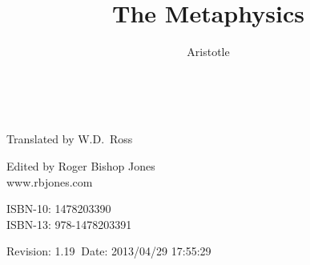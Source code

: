 \newcommand{\RbJldq}{``}
\newcommand{\RbJrdq}{''}
\newcommand{\RbJdq}{\textquotedbl}

\title{The Metaphysics}
\author{Aristotle}
\date{\ }



\renewcommand{\thechapter}{Book \arabic{chapter}}
\renewcommand{\thesection}{Part \arabic{section}}

\addtolength{\cftchapnumwidth}{3em}
\addtolength{\cftsecnumwidth}{2.5em}
\addtolength{\cftsubsecnumwidth}{0.5em}
\cftsetpnumwidth{2em}

\frontmatter

\begin{titlepage}
\maketitle

\hspace{2in}

\vfill

\begin{centering}

Translated by W.D.~Ross\\

\vspace{0.2in}

Edited by Roger Bishop Jones\\
www.rbjones.com\\

\vspace{0.2in}

ISBN-10: 1478203390\\
ISBN-13: 978-1478203391

\vspace{0.2in}

{\footnotesize

$ $Revision: 1.19 $~$Date: 2013/04/29 17:55:29 $ $

}%

\end{centering}

\thispagestyle{empty}
\end{titlepage}


{\parskip=0pt\tableofcontents}
\vfill

